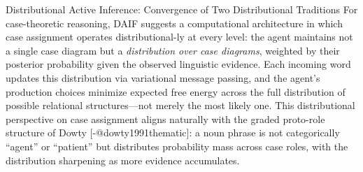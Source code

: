 \documentclass[
  ignorenonframetext,
]{beamer}
\begin{document}
\begin{frame}{Distributional Active Inference: Convergence of Two
Distributional Traditions}
For case-theoretic reasoning, DAIF suggests a computational architecture
in which case assignment operates distributional-ly at every level: the
agent maintains not a single case diagram but a \emph{distribution over
case diagrams}, weighted by their posterior probability given the
observed linguistic evidence. Each incoming word updates this
distribution via variational message passing, and the agent's production
choices minimize expected free energy across the full distribution of
possible relational structures---not merely the most likely one. This
distributional perspective on case assignment aligns naturally with the
graded proto-role structure of Dowty {[}-@dowty1991thematic{]}: a noun
phrase is not categorically ``agent'' or ``patient'' but distributes
probability mass across case roles, with the distribution sharpening as
more evidence accumulates.
\end{frame}
\end{document}
